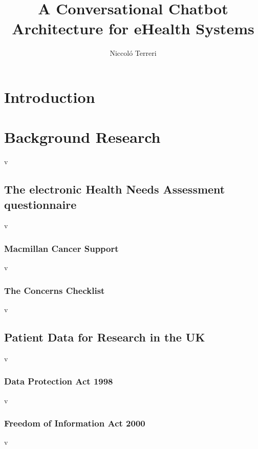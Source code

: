 \documentclass[12pt, twoside, a4paper, draft]{report}
\author{Niccol\'o Terreri}
\title{A Conversational Chatbot Architecture for eHealth Systems}
\begin{document}
\maketitle
\tableofcontents

\chapter{Introduction}

\chapter{Background Research}v
\section{The electronic Health Needs Assessment questionnaire}v
\subsection{Macmillan Cancer Support}v
\subsection{The Concerns Checklist}v
\section{Patient Data for Research in the UK}v
\subsection{Data Protection Act 1998}v
\subsection{Freedom of Information Act 2000}v
\end{document}
